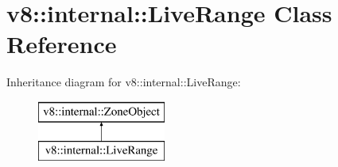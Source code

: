 \hypertarget{classv8_1_1internal_1_1_live_range}{}\section{v8\+:\+:internal\+:\+:Live\+Range Class Reference}
\label{classv8_1_1internal_1_1_live_range}
Inheritance diagram for v8\+:\+:internal\+:\+:Live\+Range\+:\begin{figure}[H]
\begin{center}
\leavevmode
\includegraphics[height=2.000000cm]{classv8_1_1internal_1_1_live_range}
\end{center}
\end{figure}

